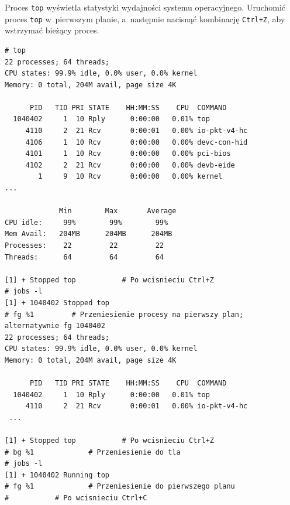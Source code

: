 \begin{example}

Proces \lstinline[style=MyBashStyle]{top} wyświetla statystyki wydajności systemu operacyjnego. Uruchomić proces \lstinline[style=MyBashStyle]{top} w~pierwszym planie, a~następnie nacisnąć kombinację \mbox{\lstinline[style=MyBashStyle]{Ctrl+Z}}, aby wstrzymać bieżący proces.

\begin{lstlisting}[style=MyBashStyle]
# top
22 processes; 64 threads;
CPU states: 99.9% idle, 0.0% user, 0.0% kernel
Memory: 0 total, 204M avail, page size 4K

      PID   TID PRI STATE    HH:MM:SS    CPU  COMMAND
  1040402     1  10 Rply      0:00:00   0.01% top
     4110     2  21 Rcv       0:00:01   0.00% io-pkt-v4-hc
     4106     1  10 Rcv       0:00:00   0.00% devc-con-hid
     4101     1  10 Rcv       0:00:00   0.00% pci-bios
     4102     2  21 Rcv       0:00:00   0.00% devb-eide
        1     9  10 Rcv       0:00:00   0.00% kernel
...

             Min        Max       Average 
CPU idle:     99%        99%        99% 
Mem Avail:   204MB      204MB      204MB  
Processes:    22         22         22    
Threads:      64         64         64    

[1] + Stopped top 			# Po wcisnieciu Ctrl+Z
# jobs -l
[1] + 1040402 Stopped top
# fg %1			# Przeniesienie procesy na pierwszy plan; alternatywnie fg 1040402
22 processes; 64 threads;
CPU states: 99.9% idle, 0.0% user, 0.0% kernel
Memory: 0 total, 204M avail, page size 4K

      PID   TID PRI STATE    HH:MM:SS    CPU  COMMAND
  1040402     1  10 Rply      0:00:00   0.01% top
     4110     2  21 Rcv       0:00:01   0.00% io-pkt-v4-hc
 ...    

[1] + Stopped top 			# Po wcisnieciu Ctrl+Z
# bg %1 			# Przeniesienie do tla     
# jobs -l 
[1] + 1040402 Running top
# fg %1 			# Przeniesienie do pierwszego planu
# 			# Po wcisnieciu Ctrl+C
\end{lstlisting}

\end{example} 


